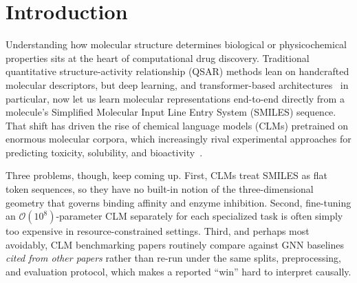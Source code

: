 \documentclass[final,1p,times]{elsarticle}
\begin{document}


\section{Introduction}\label{sec1}
Understanding how molecular structure determines biological or physicochemical properties sits at the heart of computational drug discovery. Traditional quantitative structure-activity relationship (QSAR) methods lean on handcrafted molecular descriptors, but deep learning, and transf\-ormer-based architectures~\cite{vaswani2017attention} in particular, now let us learn molecular representations end-to-end directly from a molecule's Simplified Molecular Input Line Entry System (SMILES) sequence. That shift has driven the rise of chemical language models (CLMs) pretrained on enormous molecular corpora, which increasingly rival experimental approaches for predicting toxicity, solubility, and bioactivity~\cite{ahmad2022chemberta2,huang2020deeppurpose}.

Three problems, though, keep coming up. First, CLMs treat SMILES as flat token sequences, so they have no built-in notion of the three-dimensional geometry that governs binding affinity and enzyme inhibition. Second, fine-tuning an $\mathcal{O}(10^8)$-parameter CLM separately for each specialized task is often simply too expensive in resource-constrained settings. Third, and perhaps most avoidably, CLM benchmarking papers routinely compare against GNN baselines \emph{cited from other papers} rather than re-run under the same splits, preprocessing, and evaluation protocol, which makes a reported ``win'' hard to interpret causally.
\end{document}
